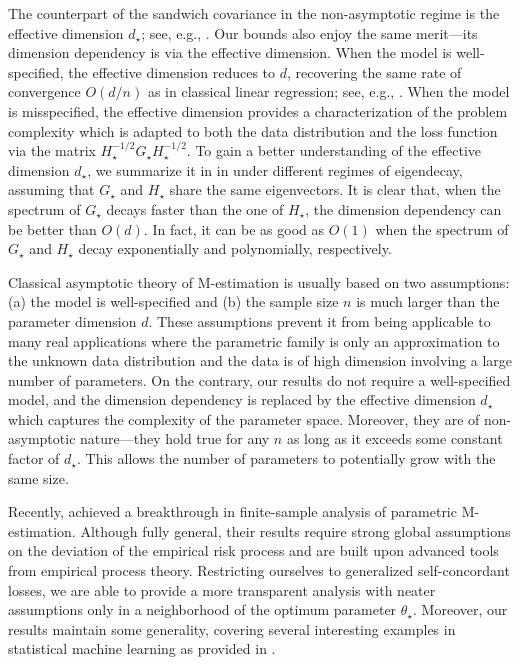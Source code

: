 The counterpart of the sandwich covariance in the non-asymptotic regime is the effective dimension $d_\star$; see, e.g., \citep{spokoiny2017penalized,ostrovskii2021finite}.
Our bounds also enjoy the same merit---its dimension dependency is via the effective dimension.
When the model is well-specified, the effective dimension reduces to $d$, recovering the same rate of convergence $O(d/n)$ as in classical linear regression; see, e.g., \cite[Prop.~3.5]{bach2021learning}.
When the model is misspecified, the effective dimension provides a characterization of the problem complexity which is adapted to both the data distribution and the loss function via the matrix $H_\star^{-1/2} G_\star H_\star^{-1/2}$.
To gain a better understanding of the effective dimension $d_\star$, we summarize it in  in  under different regimes of eigendecay, assuming that $G_\star$ and $H_\star$ share the same eigenvectors.
It is clear that, when the spectrum of $G_\star$ decays faster than the one of $H_\star$, the dimension dependency can be better than $O(d)$.
In fact, it can be as good as $O(1)$ when the spectrum of $G_\star$ and $H_\star$ decay exponentially and polynomially, respectively.

Classical asymptotic theory of M-estimation is usually based on two assumptions: (a) the model is well-specified and (b) the sample size $n$ is much larger than the parameter dimension $d$.
These assumptions prevent it from being applicable to many real applications where the parametric family is only an approximation to the unknown data distribution and the data is of high dimension involving a large number of parameters.
On the contrary, our results do not require a well-specified model, and the dimension dependency is replaced by the effective dimension $d_\star$ which captures the complexity of the parameter space.
Moreover, they are of non-asymptotic nature---they hold true for any $n$ as long as it exceeds some constant factor of $d_\star$.
This allows the number of parameters to potentially grow with the same size.

Recently, \citet{spokoiny2012parametric} achieved a breakthrough in finite-sample analysis of parametric M-estimation.
Although fully general, their results require strong global assumptions on the deviation of the empirical risk process and are built upon advanced tools from empirical process theory.
Restricting ourselves to generalized self-concordant losses, we are able to provide a more transparent analysis with neater assumptions only in a neighborhood of the optimum parameter $\theta_\star$.
Moreover, our results maintain some generality, covering several interesting examples in statistical machine learning as provided in .

